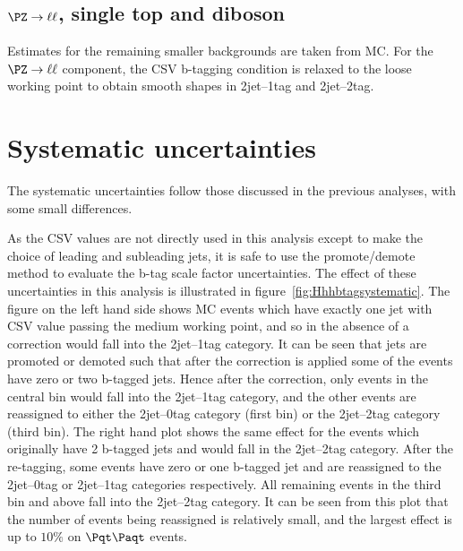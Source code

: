 \subsection{$\PZ\to\ell\ell$, single top and diboson}

Estimates for the remaining smaller backgrounds are taken from \ac{MC}. For the
$\PZ\to\ell\ell$ component, the \ac{CSV} b-tagging condition is relaxed to the
loose working point to obtain smooth shapes in 2jet--1tag and 2jet--2tag.

\section{Systematic uncertainties}
\label{sec:Hhhsystematics}

The systematic uncertainties follow those discussed in the previous analyses,
with some small differences. 

As the \ac{CSV} values are not directly used in this analysis except to make
the choice of leading and subleading jets, it is safe to use the promote/demote
method to evaluate the b-tag scale factor uncertainties. The effect of these uncertainties 
in this analysis is illustrated in figure~\ref{fig:Hhhbtagsystematic}. The figure on the left hand
side shows \ac{MC} events which have exactly one jet with \ac{CSV} value passing the medium
working point, and so in the absence of a correction would fall into the
2jet--1tag category. It can be seen that jets are promoted or demoted such that
after the correction is applied some of the events have zero or two b-tagged
jets. Hence after the correction, only events in the central bin would fall into
the 2jet--1tag category, and the other events are reassigned to either the
2jet--0tag category (first bin) or the 2jet--2tag category (third bin). The
right hand plot shows the same effect for the events which originally have 2
b-tagged jets and would fall in the 2jet--2tag category. After the re-tagging,
some events have zero or one b-tagged jet and are reassigned to the 2jet--0tag
or 2jet--1tag categories respectively. All remaining events in the third bin and
above fall into the 2jet--2tag category. It can be seen from this plot that the
number of events being reassigned is relatively small, and the largest effect is
up to $10\%$ on $\ttbar$ events.

